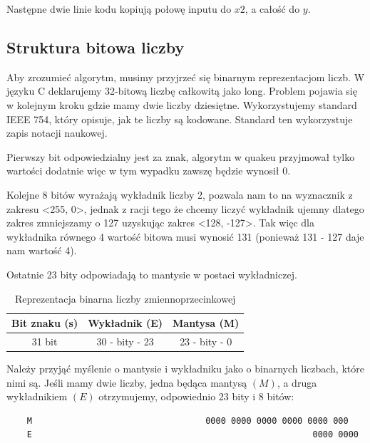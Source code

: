 \documentclass[12pt]{article}
\begin{document}
 
\noindent Następne dwie linie kodu kopiują połowę inputu do $x2$, a całość do $y$. 

\subsection{Struktura bitowa liczby}

\noindent Aby zrozumieć algorytm, musimy przyjrzeć się binarnym reprezentacjom liczb. W języku C deklarujemy 32-bitową liczbę całkowitą jako long. Problem pojawia się w kolejnym kroku gdzie mamy dwie liczby dziesiętne. Wykorzystujemy standard IEEE 754, który opisuje, jak te liczby są kodowane. Standard ten wykorzystuje zapis notacji naukowej.

Pierwszy bit odpowiedzialny jest za znak, algorytm w quakeu przyjmował tylko wartości dodatnie więc w tym wypadku zawszę będzie wynosił 0. 

Kolejne 8 bitów wyrażają wykładnik liczby 2, pozwala nam to na wyznacznik z zakresu <255, 0>, jednak z racji tego że chcemy liczyć wykładnik ujemny dlatego zakres zmniejszamy o 127 uzyskując zakres <128, -127>. Tak więc dla wykładnika równego 4 wartość bitowa musi wynosić 131 (ponieważ 131 - 127 daje nam wartość 4).

Ostatnie 23 bity odpowiadają to mantysie w postaci wykładniczej. 

\begin{table}[htbp]
\centering
\caption{Reprezentacja binarna liczby zmiennoprzecinkowej}
\label{tab:struktura bitowa floata}
\begin{tabular}{|c|c|c|}  %
\hline  %
Bit znaku (s) & Wykładnik (E) & Mantysa (M) \\ \hline  %
31 bit & 30 - bity - 23 & 23 - bity - 0 \\ \hline  %
\end{tabular}
\end{table}

\noindent Należy przyjąć myślenie o mantysie i wykładniku jako o binarnych liczbach, które nimi są. Jeśli mamy dwie liczby, jedna będąca mantysą $(M)$, a druga wykładnikiem $(E)$ otrzymujemy, odpowiednio 23 bity i 8 bitów:

\begin{lstlisting}
    M                                  0000 0000 0000 0000 0000 000
    E                                                       0000 0000
\end{lstlisting}
\end{document}
